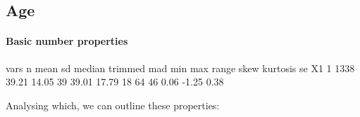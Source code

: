 \documentclass{article}
\begin{document}
\subsection{Age}
\paragraph{Basic number properties \newline} 

\begin{Schunk}
\begin{Soutput}
   vars    n  mean    sd median trimmed   mad min max range skew kurtosis   se
X1    1 1338 39.21 14.05     39   39.01 17.79  18  64    46 0.06    -1.25 0.38
\end{Soutput}
\end{Schunk}
Analysing which, we can outline these properties:
\end{document}

